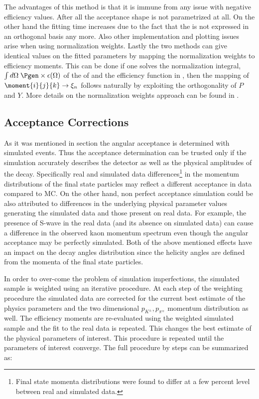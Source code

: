 The advantages of this method is that it is immune from any issue with negative efficiency values. After all the acceptance shape is not parametrized at all.
On the other hand the fitting time increases due to the fact that the \pdf is not expressed in an orthogonal basis any more. Also other
implementation and plotting issues arise when using normalization weights. Lastly the two methods can give identical values on the fitted parameters by mapping 
the normalization weights to efficiency moments. This can be done if one solves the normalization integral, $\int d\Omega\;\Pgen\times\epsilon(\Omega)$
of the \pdf of  and the efficiency function in , then the mapping of $\moment{i}{j}{k} \rightarrow \xi_n$ follows naturally
by exploiting the orthogonality of $P$ and $Y$. More details on the normalization weights approach can be found in \cite{jeroenThesis}. 

\subsection{Acceptance Corrections}
\label{Accceptance_Corrections}
As it was mentioned in section  the angular acceptance is determined with simulated \BsJpsiKst events.
Thus the acceptance determination can be trusted only if the simulation accurately describes the detector as well as the 
physical amplitudes of the \BsJpsiKst decay. Specifically real and simulated data differences\footnote{Final state momenta distributions were found to differ at a few 
percent level between real and simulated data.} in the momentum distributions
of the final state particles  may reflect a different acceptance in data compared to MC. On the other hand,
non perfect acceptance simulation could be also attributed to differences in the underlying physical parameter values generating 
the simulated data and those present on real data. For example, the presence of S-wave in the real data (and its absence on simulated data)
can cause a difference in the observed kaon momentum spectrum even though the angular acceptance may be perfectly simulated.
Both of the above mentioned effects have an impact on the decay angles distribution since the helicity angles are defined
from the momenta of the final state particles. 

In order to over-come the problem of simulation imperfections, the simulated sample is weighted using an iterative procedure. 
At each step of the weighting procedure the simulated data are corrected for the current best estimate of the physics 
parameters and the two dimensional $p_{K^{\pm}},p_{\pi^{\mp}}$ momentum distribution as well. 
The efficiency moments are re-evaluated using the weighted simulated sample and the fit to the real data is repeated. 
This changes the best estimate of the physical parameters of interest. This procedure is repeated until the parameters
of interest converge. The full procedure by steps can be summarized as:

